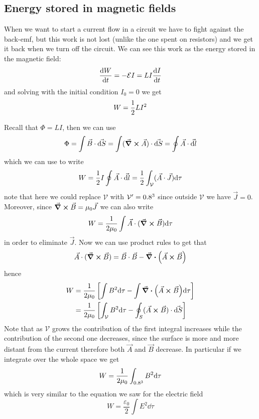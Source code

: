 \documentclass[12pt]{extarticle}
\begin{document}
\subsection{Energy stored in magnetic fields}

When we want to start a current flow in a circuit we have to fight against the back-emf,
but this work is not lost (unlike the one spent on resistors) and we get it back when we turn off the circuit.
We can see this work as the energy stored in the magnetic field:
\begin{equation}
	\dv{W}{t} = -\mathcal E I = L I \dv{I}{t}
\end{equation}
and solving with the initial condition $I_0 = 0$ we get
\begin{equation}
	W = \frac{1}{2} L I^2
\end{equation}

Recall that $\Phi = LI$, then we can use
\begin{equation}
	\Phi = \int \vec B \cdot \vec{\dd S} = \int (\curl \vec A) \cdot \vec{\dd S} = \oint \vec A \cdot \vec{\dd l}
\end{equation}
which we can use to write
\begin{equation}
	W = \frac{1}{2} I \oint \vec A \cdot \vec{\dd l} = \frac{1}{2} \int_\mathcal{V} (\vec A \cdot \vec J) \dd \tau
\end{equation}
note that here we could replace $\mathcal V$ with $\mathcal V' = 0.8^3$ since outside $\mathcal V$ we have $\vec J= 0$.
Moreover, since $\curl \vec B = \mu_0 \vec J$ we can also write
\begin{equation}
	W = \frac{1}{2\mu_0} \int \vec A \cdot (\curl \vec B) \dd \tau
\end{equation}
in order to eliminate $\vec J$.
Now we can use product rules to get that
\begin{equation}
	\vec A \cdot (\curl\vec B) = \vec B \cdot \vec B - \div (\vec A \cross \vec B)
\end{equation}
hence
\begin{align}
	W & = \frac{1}{2\mu_0} \left[\int B^2 \dd \tau - \int \div (\vec A \cross \vec B) \dd \tau \right]                   \\
	  & = \frac{1}{2\mu_0} \left[\int_\mathcal{V} B^2 \dd \tau - \oint_S (\vec A \cross \vec B) \cdot \vec{\dd S}\right]
\end{align}
Note that as $\mathcal V$ grows the contribution of the first integral increases while the contribution of the second one decreases,
since the surface is more and more distant from the current therefore both $\vec A$ and $\vec B$ decrease.
In particular if we integrate over the whole space we get
\begin{equation}
	W = \frac{1}{2 \mu_0} \int_{0.8^3} B^2 \dd \tau
\end{equation}
which is very similar to the equation we saw for the electric field
\begin{equation}
	W = \frac{\varepsilon_0}{2} \int E^2 \dd \tau
\end{equation}
\end{document}
